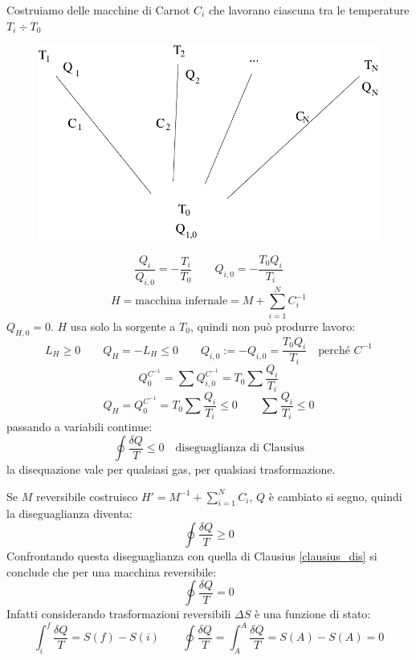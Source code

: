 Costruiamo delle macchine di Carnot $C_i$ che lavorano ciascuna tra le temperature $T_i\div T_0$
\begin{figure}[htbp]
\centering
\includegraphics[scale=0.5]{immagini/fisica1/hell_machine}
\end{figure}

\[\frac{Q_i}{Q_{i,0}}=-\frac{T_i}{T_0}\qquad Q_{i,0}=-\frac{T_0Q_i}{T_i}\]
\[H=\text{macchina infernale}=M+\sum_{i=1}^{N}C_i^{-1}\]
$Q_{H,0}=0$. $H$ usa solo la sorgente a $T_0$, quindi non può produrre lavoro:
\[L_H\geq0\qquad Q_H=-L_H\leq 0\qquad Q_{i,0}:=-Q_{i,0}=\frac{T_0Q_i}{T_i}\quad\text{perché $C^{-1}$}\]
\[Q_0^{C^{-1}}=\sum Q_{i,0}^{C^{-1}}=T_0\sum\frac{Q_i}{T_i}\]
\[Q_H=Q_0^{C^{-1}}=T_0\sum\frac{Q_i}{T_i}\leq 0\qquad \sum\frac{Q_i}{T_i}\leq 0\]
passando a variabili continue:
\begin{equation}
\oint\frac{\delta Q}{T}\leq 0\quad\text{diseguaglianza di Clausius}
\label{clausius_dis}
\end{equation}
la disequazione vale per qualsiasi gas, per qualsiasi trasformazione.

Se $M$ reversibile costruisco $H'=M^{-1}+\sum_{i=1}^N C_i$, $Q$ è cambiato si segno, quindi la diseguaglianza diventa:
\[\oint\frac{\delta Q}{T}\geq0\]
Confrontando questa diseguaglianza con quella di Clausius \eqref{clausius_dis} si conclude che per una macchina reversibile:
\begin{equation}
\oint\frac{\delta Q}{T}=0
\end{equation}
Infatti considerando trasformazioni reversibili $\Delta S$ è una funzione di stato:
\[\int_i^f\frac{\delta Q}{T}=S(f)-S(i)\qquad\oint\frac{\delta Q}{T}=\int_A^A\frac{\delta Q}{T}=S(A)-S(A)=0\]

